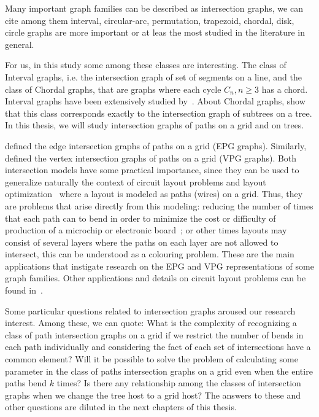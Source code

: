 Many important graph families can be described as intersection graphs, we can cite among them interval, circular-arc, permutation, trapezoid, chordal,
disk, circle graphs are more important or at leas the most studied in the literature in general. 

For us, in this study some among these classes are interesting. The class of Interval graphs, i.e. the intersection graph of set of segments on a line, and the class of Chordal graphs, that are graphs where each cycle $C_n, n\geq 3$ has a chord. Interval graphs have been extensively studied by~\cite{lekkeikerker1962representation}. About Chordal graphs, \citet{gavril1974intersection} show that this class corresponds exactly to the intersection graph of subtrees on a tree. In this thesis, we will study intersection graphs of paths on a grid and on trees.

\citet{golumbic2009} defined the edge intersection graphs of paths on a grid (EPG graphs). Similarly, \cite{asinowski2011string, asinowski2012} defined the vertex intersection graphs of paths on a grid (VPG graphs).  Both intersection models have some practical importance, since they can be used to generalize naturally the context of
circuit layout problems and layout optimization~\cite{sinden1966topology} where a layout is modeled
as paths (wires) on a grid. Thus, they are problems that arise directly from this modeling: reducing the number of times that each path can to bend in order to minimize the cost or difficulty of production of a microchip or electronic board~\cite{bandy1990,molitor1991}; or  other times layouts may consist of several layers where the paths on each layer are not allowed to intersect, this can be understood as a colouring problem. These are the main applications that instigate research on the EPG and VPG representations of some graph families. Other applications and details on circuit layout problems can be found in~\cite{bandy1990, molitor1991, sinden1966topology}.

Some particular questions related to intersection graphs aroused our research interest. Among these, we can quote: What is the complexity of recognizing a class of path intersection graphs on a grid if we restrict the number of bends in each path individually and considering the fact of each set of intersections have a common element? Will it be possible to solve the problem of calculating some parameter in the class of paths intersection graphs on a grid  even when the entire paths bend $k$ times? Is there any relationship among the classes of intersection graphs when we change the tree host to a grid host? The answers to these and other questions are diluted in the next chapters of this thesis.


